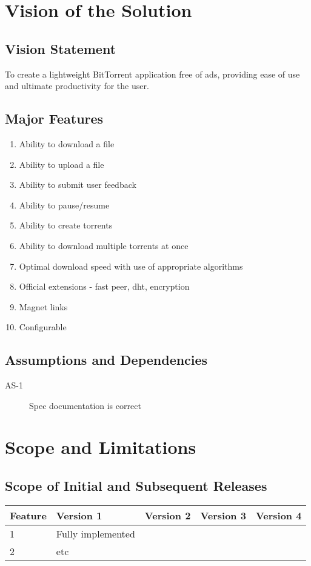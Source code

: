 \documentclass[letter]{scrartcl}
\begin{document}
\section{Vision of the Solution}
\subsection{Vision Statement}
To create a lightweight BitTorrent application free of ads, providing ease of use and ultimate productivity for the user.
\subsection{Major Features}
\begin{enumerate}
\item Ability to download a file
\item Ability to upload a file
\item Ability to submit user feedback
\item Ability to pause/resume
\item Ability to create torrents
\item Ability to download multiple torrents at once
\item Optimal download speed with use of appropriate algorithms
\item Official extensions - fast peer, dht, encryption
\item Magnet links
\item Configurable
\end{enumerate}

\subsection{Assumptions and Dependencies}
\begin{description}
\item[AS-1] Spec documentation is correct
\end{description}

\section{Scope and Limitations}
\subsection{Scope of Initial and Subsequent Releases}
\begin{tabular}{| l | l | l | l | l |}
\hline
\textbf{Feature} & \textbf{Version 1} & \textbf{Version 2} & \textbf{Version 3} & \textbf{Version 4} \\
\hline
\hline
1 & Fully implemented & & & \\
\hline
2 & etc & & & \\
\hline
\end{tabular}
\end{document}
